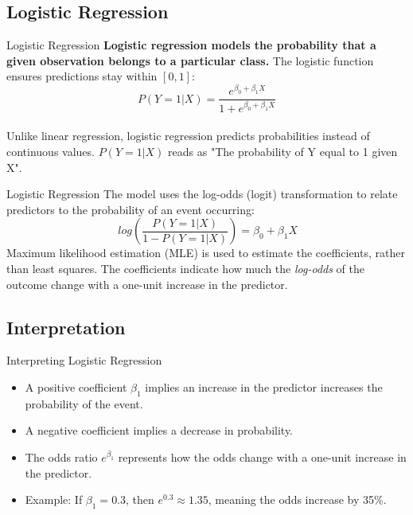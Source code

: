 \documentclass[aspectratio=169,xcolor=dvipsnames]{beamer}
\begin{document}
\subsection{Logistic Regression}
\begin{frame}{Logistic Regression}
\textbf{Logistic regression models the probability that a given observation belongs to a particular class.}	The logistic function ensures predictions stay within \([0,1]\):
        \begin{equation}
            P(Y=1|X) = \frac{e^{\beta_0 + \beta_1X}}{1 + e^{\beta_0 + \beta_1X}}
        \end{equation} \\
        Unlike linear regression, logistic regression predicts probabilities instead of continuous values. $P(Y=1|X)$ reads as "The probability of Y equal to 1 given X".
	\end{frame}

\begin{frame}{Logistic Regression}
	The model uses the log-odds (logit) transformation to relate predictors to the probability of an event occurring:
        \begin{equation}
            \,log \left( \frac{P(Y=1|X)}{1 - P(Y=1|X)} \right) = \beta_0 + \beta_1 X
        \end{equation}
	Maximum likelihood estimation (MLE) is used to estimate the coefficients, rather than least squares.
	The coefficients indicate how much the \textit{log-odds} of the outcome change with a one-unit increase in the predictor. 
\end{frame}

\subsection{Interpretation}
\begin{frame}{Interpreting Logistic Regression}
    \begin{itemize}
    	\setlength\itemsep{0.33cm}
        \item A positive coefficient \( \beta_1 \) implies an increase in the predictor increases the probability of the event.
        \item A negative coefficient implies a decrease in probability.
        \item The odds ratio \( e^{\beta_1} \) represents how the odds change with a one-unit increase in the predictor.
        \item Example: If \( \beta_1 = 0.3 \), then \( e^{0.3} \approx 1.35 \), meaning the odds increase by 35\%.
    \end{itemize}
\end{frame}
\end{document}
